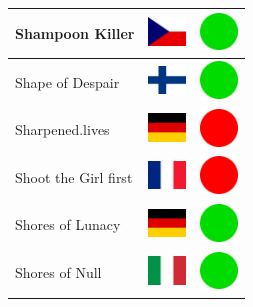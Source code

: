 \documentclass[12pt, a4paper, twoside]{report}
\begin{document}
\begin{center}
\begin{longtable}{|p{5cm}|p{2cm}|p{2cm}|}
 Shampoon Killer                                            & \includegraphics[width=1cm]{../4x3/cz} &   \includegraphics[width=1cm]{../likes/y} \\ \hline
 Shape of Despair                                           & \includegraphics[width=1cm]{../4x3/fi} &   \includegraphics[width=1cm]{../likes/y} \\ \hline
 Sharpened.lives                                            & \includegraphics[width=1cm]{../4x3/de} &   \includegraphics[width=1cm]{../likes/n} \\ \hline
 Shoot the Girl first                                       & \includegraphics[width=1cm]{../4x3/fr} &   \includegraphics[width=1cm]{../likes/n} \\ \hline
 Shores of Lunacy                                           & \includegraphics[width=1cm]{../4x3/de} &   \includegraphics[width=1cm]{../likes/y} \\ \hline
 Shores of Null                                             & \includegraphics[width=1cm]{../4x3/it} &   \includegraphics[width=1cm]{../likes/y} \\ \hline

\end{longtable}
\end{center}
\end{document}

